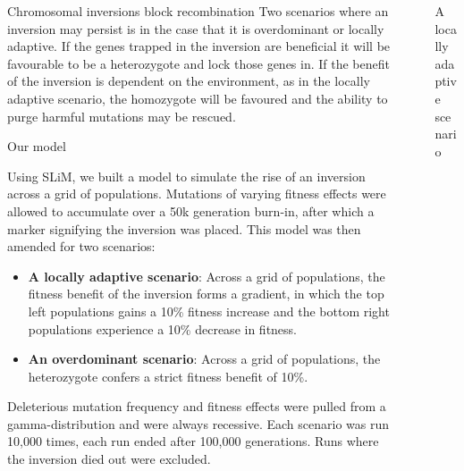 \documentclass[final]{beamer}
\newlength{\sepwidth}
\newlength{\colwidth}
\newcommand{\separatorcolumn}{\begin{column}{\sepwidth}\end{column}}
\begin{document}
\begin{frame}[t]
\begin{columns}[t]
\begin{column}{\colwidth}
\begin{block}{Chromosomal inversions block recombination}
    Two scenarios where an inversion may persist is in the case that it is overdominant or locally adaptive. If the genes trapped in the inversion are beneficial it will be favourable to be a heterozygote and lock those genes in. If the benefit of the inversion is dependent on the environment, as in the locally adaptive scenario, the homozygote will be favoured and the ability to purge harmful mutations may be rescued.

  \end{block}

  \begin{exampleblock}{Our model}

    Using SLiM, we built a model to simulate the rise of an inversion across a grid of populations. Mutations of varying fitness effects were allowed to accumulate over a 50k generation burn-in, after which a marker signifying the inversion was placed. This model was then amended for two scenarios:

    \begin{itemize}
      \item \textbf{A locally adaptive scenario}: Across a grid of populations, the fitness benefit of the inversion forms a gradient, in which the top left populations gains a 10\% fitness increase and the bottom right populations experience a 10\% decrease in fitness.
      \item \textbf{An overdominant scenario}: Across a grid of populations, the heterozygote confers a strict fitness benefit of 10\%.
    \end{itemize}

    Deleterious mutation frequency and fitness effects were pulled from a gamma-distribution and were always recessive. Each scenario was run 10,000 times, each run ended after 100,000 generations. Runs where the inversion died out were excluded.
    
  \end{exampleblock}

\end{column}

\separatorcolumn

\begin{column}{\colwidth}

    \begin{block}{A locally adaptive scenario}


\end{block}
\end{column}
\end{columns}
\end{frame}
\end{document}
